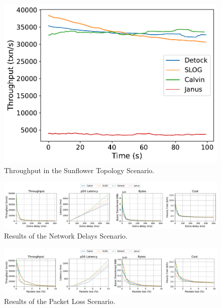 \documentclass{article}
\begin{document}
\begin{figure}[ht]
  \centering
  \includegraphics[width=\columnwidth]{figures/Sunflower Throughput.pdf}
  \caption{Throughput in the Sunflower Topology Scenario.}
  \label{fig: sunflower-throughput}
\end{figure}

\begin{figure}[ht]
    \centering
    \includegraphics[width=1\textwidth]{figures/Network.pdf}
    \caption{Results of the Network Delays Scenario.}
    \label{fig: network-delays-scenario}
\end{figure}

\begin{figure}[ht]
    \centering
    \includegraphics[width=1\textwidth]{figures/Packet Loss.pdf}
    \caption{Results of the Packet Loss Scenario.}
    \label{fig: packet-loss-scenario}
\end{figure}
\end{document}
